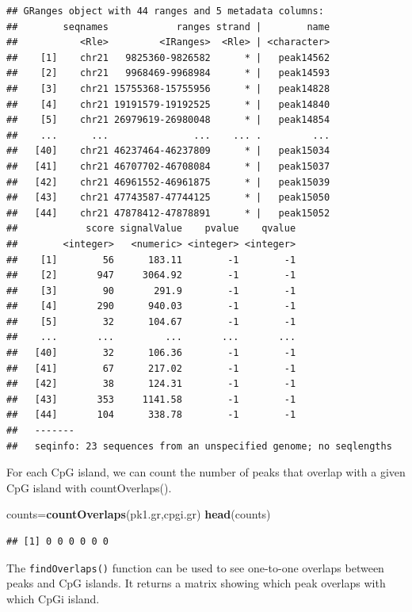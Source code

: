 \documentclass[12pt,]{krantz}
\newenvironment{Shaded}{\begin{snugshade}}{\end{snugshade}}
\newcommand{\KeywordTok}[1]{\textcolor[rgb]{0.13,0.29,0.53}{\textbf{#1}}}
\newcommand{\NormalTok}[1]{#1}
\begin{document}
\begin{verbatim}
## GRanges object with 44 ranges and 5 metadata columns:
##        seqnames            ranges strand |        name
##           <Rle>         <IRanges>  <Rle> | <character>
##    [1]    chr21   9825360-9826582      * |   peak14562
##    [2]    chr21   9968469-9968984      * |   peak14593
##    [3]    chr21 15755368-15755956      * |   peak14828
##    [4]    chr21 19191579-19192525      * |   peak14840
##    [5]    chr21 26979619-26980048      * |   peak14854
##    ...      ...               ...    ... .         ...
##   [40]    chr21 46237464-46237809      * |   peak15034
##   [41]    chr21 46707702-46708084      * |   peak15037
##   [42]    chr21 46961552-46961875      * |   peak15039
##   [43]    chr21 47743587-47744125      * |   peak15050
##   [44]    chr21 47878412-47878891      * |   peak15052
##            score signalValue    pvalue    qvalue
##        <integer>   <numeric> <integer> <integer>
##    [1]        56      183.11        -1        -1
##    [2]       947     3064.92        -1        -1
##    [3]        90       291.9        -1        -1
##    [4]       290      940.03        -1        -1
##    [5]        32      104.67        -1        -1
##    ...       ...         ...       ...       ...
##   [40]        32      106.36        -1        -1
##   [41]        67      217.02        -1        -1
##   [42]        38      124.31        -1        -1
##   [43]       353     1141.58        -1        -1
##   [44]       104      338.78        -1        -1
##   -------
##   seqinfo: 23 sequences from an unspecified genome; no seqlengths
\end{verbatim}

For each CpG island, we can count the number of peaks that overlap with a given CpG island with countOverlaps().

\begin{Shaded}
\begin{Highlighting}[]
\NormalTok{counts=}\KeywordTok{countOverlaps}\NormalTok{(pk1.gr,cpgi.gr)}
\KeywordTok{head}\NormalTok{(counts)}
\end{Highlighting}
\end{Shaded}

\begin{verbatim}
## [1] 0 0 0 0 0 0
\end{verbatim}

The \texttt{findOverlaps()} function can be used to see one-to-one overlaps between peaks and CpG islands. It returns a matrix showing which peak overlaps with which CpGi island.
\end{document}
